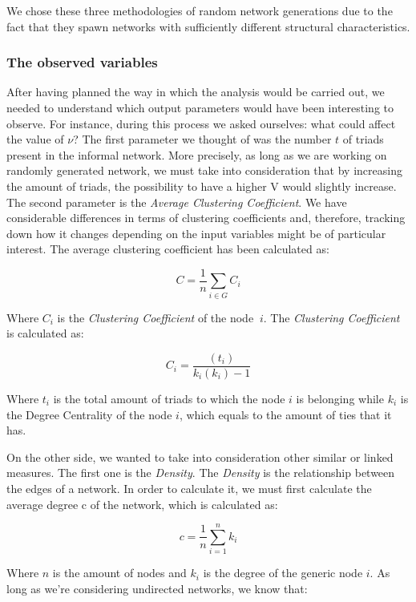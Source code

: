 \documentclass{article}
\begin{document}
We chose these three methodologies of random network generations due to the fact that they spawn networks with sufficiently different structural characteristics.


\bigskip
\subsubsection{The observed variables}
After having planned the way in which the analysis would be carried out, we needed to understand which output parameters would have been interesting to observe. For instance, during this process we asked ourselves: what could affect the value of $\nu$?
The first parameter we thought of was the number $t$ of triads present in the informal network. More precisely, as long as we are working on randomly generated network, we must take into consideration that by increasing the amount of triads, the possibility to have a higher V would slightly increase.
The second parameter is the \emph{Average Clustering Coefficient}. We have considerable differences in terms of clustering coefficients and, therefore, tracking down how it changes depending on the input variables might be of particular interest. The average clustering coefficient has been calculated as:

\begin{equation}
C=\frac{1}{n}\sum_{i\in G}C_i
\end{equation}

Where $C_i$ is the \emph{Clustering Coefficient} of the node $\ i$. The \emph{Clustering Coefficient} is calculated as:

\begin{equation}
C_i=\frac{(t_i)}{k_i(k_i)-1}
\end{equation}

Where $t_i$ is the total amount of triads to which the node $i$ is belonging while $k_i$ is the Degree Centrality of the node $i$, which equals to the amount of ties that it has. 

On the other side, we wanted to take into consideration other similar or linked measures. The first one is the \emph{Density}. The \emph{Density} is the relationship between the edges of a network. In order to calculate it, we must first calculate the average degree c of the network, which is calculated as:

\begin{equation}
c=\frac{1}{n}\sum_{i=1}^{n}k_i
\end{equation}

Where $n$ is the amount of nodes and $k_i$ is the degree of the generic node $i$. As long as we’re considering undirected networks, we know that:
\end{document}
